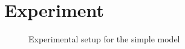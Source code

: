 \section{Experiment}

\begin{figure}

\caption{Experimental setup for the simple model}
\end{figure}
